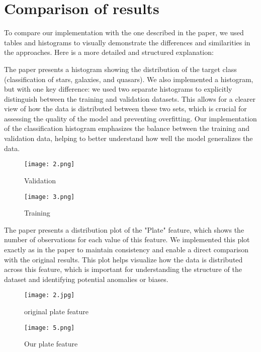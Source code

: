 \documentclass[journal,onecolumn]{IEEEtran}
\begin{document}
\section{Comparison of results}
To compare our implementation with the one described in the paper, we used tables and histograms to visually demonstrate the differences and similarities in the approaches. Here is a more detailed and structured explanation:

The paper presents a histogram showing the distribution of the target class (classification of stars, galaxies, and quasars). We also implemented a histogram, but with one key difference: we used two separate histograms to explicitly distinguish between the training and validation datasets. This allows for a clearer view of how the data is distributed between these two sets, which is crucial for assessing the quality of the model and preventing overfitting. Our implementation of the classification histogram emphasizes the balance between the training and validation data, helping to better understand how well the model generalizes the data.
\clearpage
\begin{figure}[htbp]
    \centering
    \begin{minipage}[t]{0.47\textwidth}
        \centering
        \texttt{[image: 2.png]}
        \caption{Validation}

    \end{minipage}
    \hfill
    \begin{minipage}[t]{0.47\textwidth}
        \centering
        \texttt{[image: 3.png]}
        \caption{Training}
    \end{minipage}
\end{figure}

The paper presents a distribution plot of the "Plate" feature, which shows the number of observations for each value of this feature. We implemented this plot exactly as in the paper to maintain consistency and enable a direct comparison with the original results. This plot helps visualize how the data is distributed across this feature, which is important for understanding the structure of the dataset and identifying potential anomalies or biases.

\begin{figure}[htbp]
    \centering
    \begin{minipage}[t]{0.57\textwidth}
        \centering
        \texttt{[image: 2.jpg]}
        \caption{original plate feature}
    \end{minipage}
    \hfill
    \begin{minipage}[t]{0.41\textwidth}
        \centering
        \texttt{[image: 5.png]}
        \caption{Our plate feature }
    \end{minipage}
\end{figure}
\end{document}
